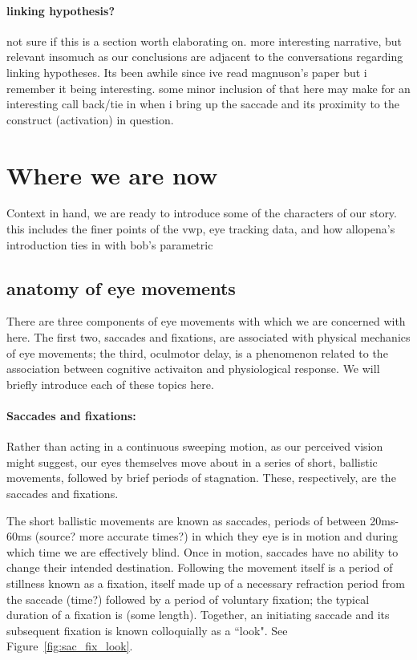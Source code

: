 \documentclass{article}
\begin{document}
\paragraph{linking hypothesis?} not sure if this is a section worth elaborating on. more interesting narrative, but relevant insomuch as our conclusions are adjacent to the conversations regarding linking hypotheses. Its been awhile since ive read magnuson's paper but i remember it being interesting. some minor inclusion of that here may make for an interesting call back/tie in when i bring up the saccade and its proximity to the construct (activation) in question.


\section{Where we are now}

Context in hand, we are ready to introduce some of the characters of our story. this includes the finer points of the vwp, eye tracking data, and how allopena's introduction ties in with bob's parametric

\subsection{anatomy of eye  movements}

There are three components of eye movements with which we are concerned with here. The first two, saccades and fixations, are associated with physical mechanics of eye movements; the third, oculmotor delay, is a phenomenon related to the association between cognitive activaiton and physiological response. We will briefly introduce each of these topics here. 

\paragraph{Saccades and fixations:} Rather than acting in a continuous sweeping motion, as our perceived vision might suggest, our eyes themselves move about in a series of short, ballistic movements, followed by brief periods of stagnation. These, respectively, are the saccades and fixations. 

The short ballistic movements are known as saccades, periods of between 20ms-60ms (source? more accurate times?) in which they eye is in motion and during which time we are effectively blind. Once in motion, saccades have no ability to change their intended destination. Following the movement itself is a period of stillness known as a fixation, itself made up of a necessary refraction period from the saccade (time?) followed by a period of voluntary fixation; the typical duration of a fixation is (some length). Together, an initiating saccade and its subsequent fixation is known colloquially as a ``look". See Figure~\ref{fig:sac_fix_look}.
\end{document}
